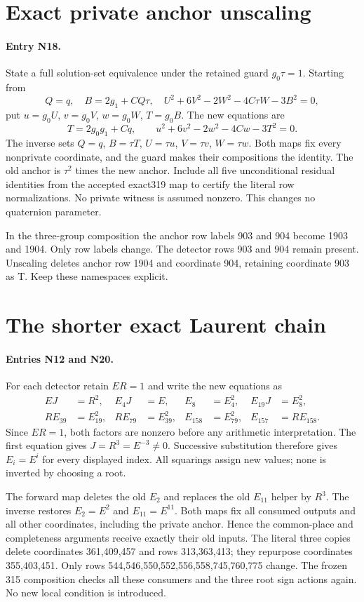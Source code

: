 \documentclass{article}
\begin{document}
\section{Exact private anchor unscaling}
\label{outline:unscale}
\paragraph{Entry N18.}
State a full solution-set equivalence under the retained guard
$g_0\tau=1$. Starting from
\[
 Q=q,\quad B=2g_1+CQ\tau,\quad
 U^2+6V^2-2W^2-4C\tau W-3B^2=0,
\]
put $u=g_0U$, $v=g_0V$, $w=g_0W$, $T=g_0B$. The new equations are
\[
 T=2g_0g_1+Cq,\qquad u^2+6v^2-2w^2-4Cw-3T^2=0.
\]
The inverse sets $Q=q$, $B=\tau T$, $U=\tau u$, $V=\tau v$,
$W=\tau w$. Both maps fix every nonprivate coordinate, and the guard
makes their compositions the identity. The old anchor is $\tau^2$
times the new anchor. Include all five unconditional residual identities
from the accepted exact319 map to certify the literal row normalizations.
No private witness is assumed nonzero. This changes no quaternion parameter.

In the three-group composition the anchor row labels 903 and 904 become
1903 and 1904. Only row labels change. The detector rows 903 and 904
remain present. Unscaling deletes anchor row 1904 and coordinate 904,
retaining coordinate 903 as T. Keep these namespaces explicit.

\section{The shorter exact Laurent chain}
\label{outline:chain}
\paragraph{Entries N12 and N20.}
For each detector retain $ER=1$ and write the new equations as
\begin{align*}
 EJ&=R^2,&E_4J&=E,&E_8&=E_4^2,&E_{19}J&=E_8^2,\\
 RE_{39}&=E_{19}^2,&RE_{79}&=E_{39}^2,&
 E_{158}&=E_{79}^2,&E_{157}&=RE_{158}.
\end{align*}
Since $ER=1$, both factors are nonzero before any arithmetic
interpretation. The first equation gives $J=R^3=E^{-3}\ne0$.
Successive substitution therefore gives $E_i=E^i$ for every displayed
index. All squarings assign new values; none is inverted by choosing a root.

The forward map deletes the old $E_2$ and replaces the old $E_{11}$
helper by $R^3$. The inverse restores $E_2=E^2$ and $E_{11}=E^{11}$.
Both maps fix all consumed outputs and all other coordinates, including
the private anchor. Hence the common-place and completeness arguments
receive exactly their old inputs. The literal three copies delete
coordinates 361,409,457 and rows 313,363,413; they repurpose coordinates
355,403,451. Only rows 544,546,550,552,556,558,745,760,775 change.
The frozen 315 composition checks all these consumers and the three root
sign actions again. No new local condition is introduced.
\end{document}
